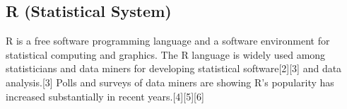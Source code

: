 %
%
%
%
%
%
%
%
%
%
%
%
%
%
%
%
%
%
%
%
%
%



\newpage
\subsection{R (Statistical System)}

R is a free software programming language and a software environment for statistical computing and graphics. The R language is widely used among statisticians and data miners for developing statistical software[2][3] and data analysis.[3] Polls and surveys of data miners are showing R's popularity has increased substantially in recent years.[4][5][6]

